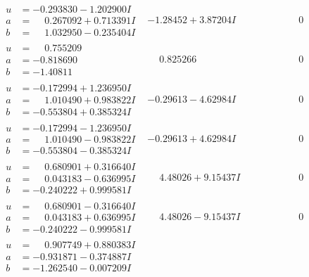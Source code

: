 \documentclass[1p]{elsarticle_modified}
\theoremstyle{definition}
\begin{document}
$$\begin{array}{c|c|c}
\begin{aligned}
u &= -0.293830 - 1.202900 I \\
a &= \phantom{-}0.267092 + 0.713391 I \\
b &= \phantom{-}1.032950 - 0.235404 I\end{aligned}
 & -1.28452 + 3.87204 I & \phantom{-0.000000 } 0 \\ \hline\begin{aligned}
u &= \phantom{-}0.755209\phantom{ +0.000000I} \\
a &= -0.818690\phantom{ +0.000000I} \\
b &= -1.40811\phantom{ +0.000000I}\end{aligned}
 & \phantom{-}0.825266\phantom{ +0.000000I} & \phantom{-0.000000 } 0 \\ \hline\begin{aligned}
u &= -0.172994 + 1.236950 I \\
a &= \phantom{-}1.010490 + 0.983822 I \\
b &= -0.553804 + 0.385324 I\end{aligned}
 & -0.29613 - 4.62984 I & \phantom{-0.000000 } 0 \\ \hline\begin{aligned}
u &= -0.172994 - 1.236950 I \\
a &= \phantom{-}1.010490 - 0.983822 I \\
b &= -0.553804 - 0.385324 I\end{aligned}
 & -0.29613 + 4.62984 I & \phantom{-0.000000 } 0 \\ \hline\begin{aligned}
u &= \phantom{-}0.680901 + 0.316640 I \\
a &= \phantom{-}0.043183 - 0.636995 I \\
b &= -0.240222 + 0.999581 I\end{aligned}
 & \phantom{-}4.48026 + 9.15437 I & \phantom{-0.000000 } 0 \\ \hline\begin{aligned}
u &= \phantom{-}0.680901 - 0.316640 I \\
a &= \phantom{-}0.043183 + 0.636995 I \\
b &= -0.240222 - 0.999581 I\end{aligned}
 & \phantom{-}4.48026 - 9.15437 I & \phantom{-0.000000 } 0 \\ \hline\begin{aligned}
u &= \phantom{-}0.907749 + 0.880383 I \\
a &= -0.931871 - 0.374887 I \\
b &= -1.262540 - 0.007209 I\end{aligned}

\end{array}$$
\end{document}
